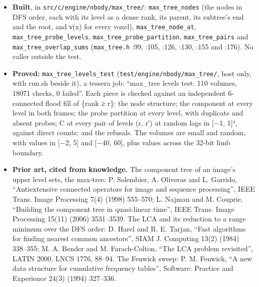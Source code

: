\begin{itemize}
a rectangle sum over the two DFS ranges, and one Fenwick sweep of J answers every asked pair of levels. The census (one partner, unpaired, mutual, forked) is the degrees of the support of C at the chosen levels. The tracker's overlap still recounts per sampled cut (built: \texttt{max\_\allowbreak{}tree\_\allowbreak{}pairs} and \texttt{max\_\allowbreak{}tree\_\allowbreak{}overlap\_\allowbreak{}sums}, one Fenwick sweep instead of a summed-area table; proved against direct counts).
\item \textbf{Built}, in \texttt{src/\allowbreak{}c/\allowbreak{}engine/\allowbreak{}nbody/\allowbreak{}max\_\allowbreak{}tree/\allowbreak{}}: \texttt{max\_\allowbreak{}tree\_\allowbreak{}nodes} (the nodes in DFS order, each with its level as a dense rank, its parent, its subtree's end and the root, and ν(x) for every voxel), \texttt{max\_\allowbreak{}tree\_\allowbreak{}node\_\allowbreak{}at}, \texttt{max\_\allowbreak{}tree\_\allowbreak{}probe\_\allowbreak{}levels}, \texttt{max\_\allowbreak{}tree\_\allowbreak{}probe\_\allowbreak{}partition}, \texttt{max\_\allowbreak{}tree\_\allowbreak{}pairs} and \texttt{max\_\allowbreak{}tree\_\allowbreak{}overlap\_\allowbreak{}sums} (\texttt{max\_\allowbreak{}tree.\allowbreak{}h} :99, :105, :126, :130, :155 and :176). No caller outside the test.
\item \textbf{Proved:} \texttt{max\_\allowbreak{}tree\_\allowbreak{}levels\_\allowbreak{}test} (\texttt{test/\allowbreak{}engine/\allowbreak{}nbody/\allowbreak{}max\_\allowbreak{}tree/\allowbreak{}}, host only, with run.sh beside it), a tessera job: “max\_\allowbreak{}tree levels test: 110 volumes, 18071 checks, 0 failed”. Each piece is checked against an independent 6-connected flood fill of \{rank ≥ r\}: the node structure; the component at every level in both frames; the probe partition at every level, with duplicate and absent probes; C at every pair of levels (r, r′) at random lags in [−1, 1]³, against direct counts; and the refusals. The volumes are small and random, with values in [−2, 5] and [−40, 60], plus values across the 32-bit limb boundary.
\item \textbf{Prior art, cited from knowledge.} The component tree of an image's upper level sets, the max-tree: P. Salembier, A. Oliveras and L. Garrido, “Antiextensive connected operators for image and sequence processing”, IEEE Trans. Image Processing 7(4) (1998) 555–570; L. Najman and M. Couprie, “Building the component tree in quasi-linear time”, IEEE Trans. Image Processing 15(11) (2006) 3531–3539. The LCA and its reduction to a range minimum over the DFS order: D. Harel and R. E. Tarjan, “Fast algorithms for finding nearest common ancestors”, SIAM J. Computing 13(2) (1984) 338–355; M. A. Bender and M. Farach-Colton, “The LCA problem revisited”, LATIN 2000, LNCS 1776, 88–94. The Fenwick sweep: P. M. Fenwick, “A new data structure for cumulative frequency tables”, Software: Practice and Experience 24(3) (1994) 327–336.
\end{itemize}

